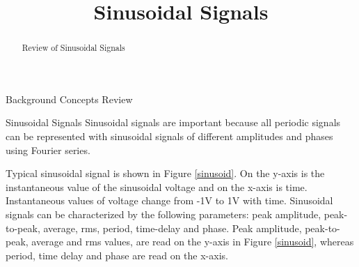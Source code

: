 \documentclass{ximera}
\title{Sinusoidal Signals}
\begin{document}
  
\begin{abstract}  
Review of Sinusoidal Signals
\end{abstract}  
\maketitle

Background Concepts Review

Sinusoidal Signals
Sinusoidal signals are important  because all periodic signals can be represented with sinusoidal signals of different amplitudes and phases using Fourier series. 

Typical sinusoidal signal is shown in Figure \ref{sinusoid}. On the y-axis is the instantaneous value of the sinusoidal voltage and on the x-axis is time. Instantaneous values of voltage change from -1V to 1V with time. Sinusoidal signals can be characterized by the following parameters: peak amplitude, peak-to-peak, average, rms, period, time-delay and phase. Peak amplitude, peak-to-peak, average and rms values, are read on the y-axis in Figure \ref{sinusoid}, whereas period, time delay and phase are read on the x-axis.
\end{document}
